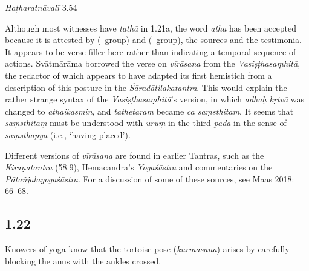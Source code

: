 \begin{ekdosis}
\begin{testimonia}[hp01_021]
\begin{versinnote}
\end{versinnote}

\emph{Haṭharatnāvalī} 3.54

\begin{versinnote}
\tl{\var{sthiram ] sthitam T}\\!}
\end{versinnote}

\end{testimonia}

\begin{philcomm}[hp01_021]   
Although most witnesses have \emph{tathā} in 1.21a, the word \emph{atha} has been accepted because it is attested by  (\textalpha\ group) and  (\texteta\ group), the sources and the testimonia. It appears to be verse filler here rather than indicating a temporal sequence of actions. Svātmārāma borrowed the verse on \emph{vīrāsana} from the \emph{Vasiṣṭhasaṃhitā}, the redactor of which appears to have adapted its first hemistich from a description of this posture in the \emph{Śāradātilakatantra}. This would explain the rather strange syntax of the \emph{Vasiṣṭhasaṃhitā}’s version, in which \emph{adhaḥ kṛtvā} was changed to \emph{athaikasmin}, and \emph{tathetaram} became \emph{ca saṃsthitam}. It seems that \emph{saṃsthitaṃ} must be understood with \emph{ūruṃ} in the third \emph{pāda} in the sense of \emph{saṃsthāpya} (i.e., ‘having placed’).

Different versions of \emph{vīrāsana} are found in earlier Tantras, such as the \emph{Kiraṇatantra} (58.9), Hemacandra’s \emph{Yogaśāstra} and commentaries on the \emph{Pātañjalayogaśāstra}. For a discussion of some of these sources, see Maas 2018: 66–68.
\end{philcomm}

\subsection*{1.22}
\begin{translation}[hp01_022]
Knowers of yoga know that the tortoise pose (\emph{kūrmāsana}) arises by carefully blocking the anus with the ankles crossed.%
\end{translation}


\end{ekdosis}
